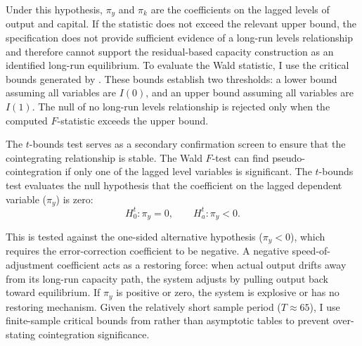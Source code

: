 Under this hypothesis, $\pi_y$ and $\pi_k$ are the coefficients on the lagged levels of output and capital. If the statistic does not exceed the relevant upper bound, the specification does not provide sufficient evidence of a long-run levels relationship and therefore cannot support the residual-based capacity construction as an identified long-run equilibrium. To evaluate the Wald statistic, I use the critical bounds generated by \citet{Pesaran2001}. These bounds establish two thresholds: a lower bound assuming all variables are $I(0)$, and an upper bound assuming all variables are $I(1)$. The null of no long-run levels relationship is rejected only when the computed $F$-statistic exceeds the upper bound.

The $t$-bounds test serves as a secondary confirmation screen to ensure that the cointegrating relationship is stable. The Wald $F$-test can find pseudo-cointegration if only one of the lagged level variables is significant. The $t$-bounds test evaluates the null hypothesis that the coefficient on the lagged dependent variable ($\pi_y$) is zero:
\begin{equation}
H_{0}^{t}: \pi_y=0, \qquad H_{a}^{t}: \pi_y<0.
\label{eq:tbounds_hypothesis}
\end{equation}

This is tested against the one-sided alternative hypothesis ($\pi_y < 0$), which requires the error-correction coefficient to be negative. A negative speed-of-adjustment coefficient acts as a restoring force: when actual output drifts away from its long-run capacity path, the system adjusts by pulling output back toward equilibrium. If $\pi_y$ is positive or zero, the system is explosive or has no restoring mechanism. Given the relatively short sample period ($T \approx 65$), I use finite-sample critical bounds from \citet{NatsiopoulosTzeremes2022} rather than asymptotic tables to prevent over-stating cointegration significance.

